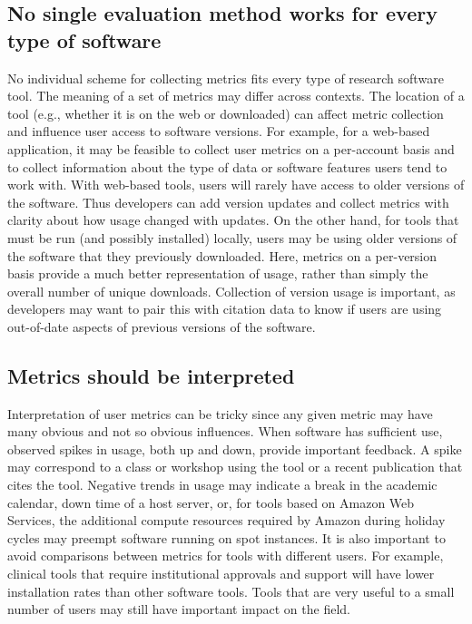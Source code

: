 \documentclass{article}
\begin{document}
\subsection{No single evaluation method works for every type of software}
\label{sec:no_one_way}
No individual scheme for collecting metrics fits every type of research software tool.  The meaning of a set of metrics may differ across contexts. The location of a tool (e.g., whether it is on the web or downloaded) can affect metric collection and influence user access to software versions. For example, for a web-based application, it may be feasible to collect user metrics on a per-account basis and to collect information about the type of data or software features users tend to work with. With web-based tools, users will rarely have access to older versions of the software. Thus developers can add version updates and collect metrics with clarity about how usage changed with updates. On the other hand, for tools that must be run (and possibly installed) locally, users may be using older versions of the software that they previously downloaded. Here, metrics on a per-version basis provide a much better representation of usage, rather than simply the overall number of unique downloads. Collection of version usage is important, as developers may want to pair this with citation data to know if users are using out-of-date aspects of previous versions of the software.



 \subsection{Metrics should be interpreted}
 
 Interpretation of user metrics can be tricky since any given metric may have many obvious and not so obvious influences. When software has sufficient use, observed spikes in usage, both up and down, provide important feedback. A spike may correspond to a class or workshop using the tool or a recent publication that cites the tool. Negative trends in usage may indicate a break in the academic calendar, down time of a host server, or, for tools based on Amazon Web Services, the additional compute resources required by Amazon during holiday cycles may preempt software running on spot instances. It is also important to avoid comparisons between metrics for tools with different users. For example, clinical tools that require institutional approvals and support will have lower installation rates than other software tools. Tools that are very useful to a small number of users may still have important impact on the field.
\end{document}
